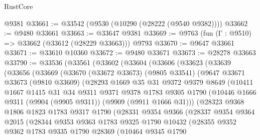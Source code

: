 \begin{lexlean}{RustCore}
\begin{coremodule}
    @9381
@33661 := @33542 (@9530 (@10290 (@28222 (@9540 @9382))))
@33662 := @9480 @33661
@33663 := @33647 @9381
@33669 := @9763 (fun (Γ : @9510) => @33662 (@33612 (@28229 @33663))) @9793
@33670 := @9647 @33661
@33671 := @33610 @10360
@33672 := @9480 @33671
@33673 := @28278 @33663
@33790 := @33536
    (@33561
      (@33602
        (@33604
          (@33606
            (@33623
              (@33639
                (@33656
                  (@33669
                    (@33670
                      (@33672 @33673)
                      (@9805 @33541)
                      (@9647
                        @33671
                        @33673
                        (@9810 @33609)
                        (@28293
                          @1669
                          @35
                          @31
                          @9372
                          @9379
                          @8649
                          (@10411
                            @1667
                            @1415
                            @31
                            @34
                            @9311
                            @9371
                            @9378
                            @1783
                            @9305
                            @1790
                            (@10446 @1666 @9311 (@9904 (@9905 @9311)) (@9909 (@9911 @1666 @31)))
                            (@28323
                              @9368
                              @1806
                              @1823
                              @1783
                              @9317
                              @1790
                              (@28331
                                @9354
                                @9366
                                (@28337
                                  @9354
                                  @9364
                                  @2015
                                  (@28344
                                    @9353
                                    @9363
                                    @1783
                                    @9325
                                    @1790
                                    @10432
                                    (@28355
                                      @9352
                                      @9362
                                      @1783
                                      @9335
                                      @1790
                                      @28369
                                      (@10464
                                        @9345
                                        @1790

\end{coremodule}
\end{lexlean}

